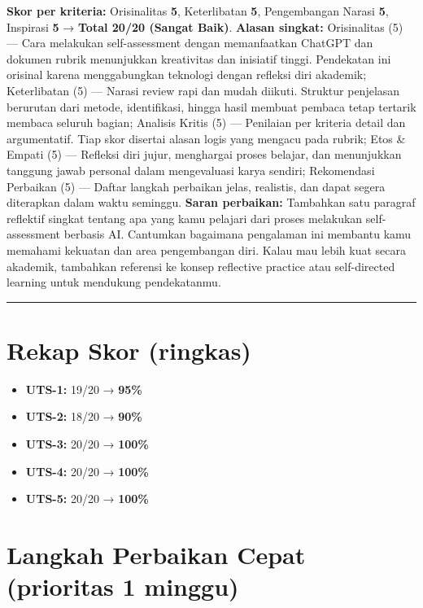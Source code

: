 \documentclass[
  letterpaper,
  DIV=11,
  numbers=noendperiod]{scrreprt}
\providecommand{\tightlist}{%
  \setlength{\itemsep}{0pt}\setlength{\parskip}{0pt}}
\begin{document}
\textbf{Skor per kriteria:} Orisinalitas \textbf{5}, Keterlibatan
\textbf{5}, Pengembangan Narasi \textbf{5}, Inspirasi \textbf{5} →
\textbf{Total 20/20 (Sangat Baik)}. \textbf{Alasan singkat:}
Orisinalitas (5) --- Cara melakukan self-assessment dengan memanfaatkan
ChatGPT dan dokumen rubrik menunjukkan kreativitas dan inisiatif tinggi.
Pendekatan ini orisinal karena menggabungkan teknologi dengan refleksi
diri akademik; Keterlibatan (5) --- Narasi review rapi dan mudah
diikuti. Struktur penjelasan berurutan dari metode, identifikasi, hingga
hasil membuat pembaca tetap tertarik membaca seluruh bagian; Analisis
Kritis (5) --- Penilaian per kriteria detail dan argumentatif. Tiap skor
disertai alasan logis yang mengacu pada rubrik; Etos \& Empati (5) ---
Refleksi diri jujur, menghargai proses belajar, dan menunjukkan tanggung
jawab personal dalam mengevaluasi karya sendiri; Rekomendasi Perbaikan
(5) --- Daftar langkah perbaikan jelas, realistis, dan dapat segera
diterapkan dalam waktu seminggu. \textbf{Saran perbaikan:} Tambahkan
satu paragraf reflektif singkat tentang apa yang kamu pelajari dari
proses melakukan self-assessment berbasis AI. Cantumkan bagaimana
pengalaman ini membantu kamu memahami kekuatan dan area pengembangan
diri. Kalau mau lebih kuat secara akademik, tambahkan referensi ke
konsep reflective practice atau self-directed learning untuk mendukung
pendekatanmu.

\begin{center}\rule{0.5\linewidth}{0.5pt}\end{center}

\section{Rekap Skor (ringkas)}\label{rekap-skor-ringkas}

\begin{itemize}
\tightlist
\item
  \textbf{UTS-1:} 19/20 → \textbf{95\%}
\item
  \textbf{UTS-2:} 18/20 → \textbf{90\%}
\item
  \textbf{UTS-3:} 20/20 → \textbf{100\%}
\item
  \textbf{UTS-4:} 20/20 → \textbf{100\%}
\item
  \textbf{UTS-5:} 20/20 → \textbf{100\%}
\end{itemize}

\section{Langkah Perbaikan Cepat (prioritas 1
minggu)}\label{langkah-perbaikan-cepat-prioritas-1-minggu}
\end{document}
